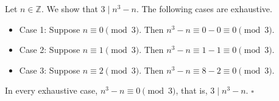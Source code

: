 Let $n \in \mathbb{Z}$.
We show that $3 \mid n^{3} - n$.
The following cases are exhaustive.

\begin{itemize}
  \item Case 1: Suppose $n \equiv 0 \pmod{3}$.
    Then $n^{3} - n \equiv 0 - 0 \equiv 0 \pmod{3}$.
  \item Case 2: Suppose $n \equiv 1 \pmod{3}$.
    Then $n^{3} - n \equiv 1 - 1 \equiv 0 \pmod{3}$.
  \item Case 3: Suppose $n \equiv 2 \pmod{3}$.
    Then $n^{3} - n \equiv 8 - 2 \equiv 0 \pmod{3}$.
\end{itemize}

In every exhaustive case, $n^{3} - n \equiv 0 \pmod{3}$, that is, $3 \mid n^{3} - n$. \hfill$\square$